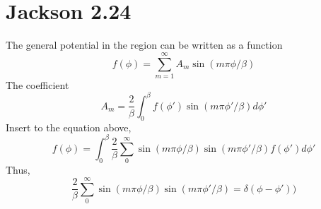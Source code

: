 \documentclass[notitlepage]{revtex4-1}
\begin{document}
\section*{Jackson 2.24}
The general potential in the region can be written as a function
\[ f(\phi)=\sum^{\infty}_{m=1}A_m\sin(m\pi\phi/\beta) \]
The coefficient
\[ A_m=\frac{2}{\beta}\int^{\beta}_0f(\phi')\sin(m\pi\phi'/\beta)d\phi' \]
Insert to the equation above,
\[ f(\phi)=\int^{\beta}_0\frac{2}{\beta}\sum^{\infty}_0\sin(m\pi\phi/\beta)\sin(m\pi\phi'/\beta)f(\phi')d\phi' \]
Thus,
\[\frac{2}{\beta}\sum^{\infty}_0\sin(m\pi\phi/\beta)\sin(m\pi\phi'/\beta)=\delta(\phi-\phi'))\]




%
%
\end{document}
